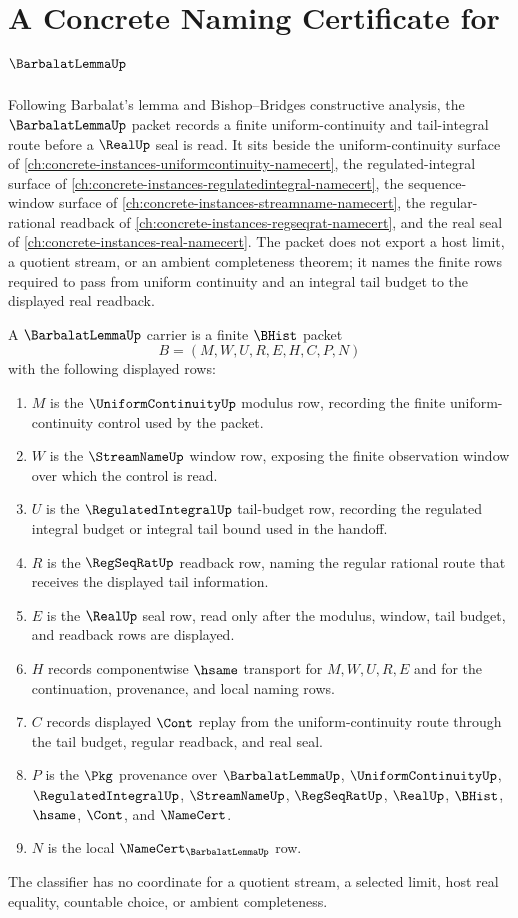 \chapter{A Concrete Naming Certificate for $\BarbalatLemmaUp$}
\label{ch:concrete-instances-barbalat-lemma-namecert}

Following Barbalat's lemma and Bishop--Bridges constructive analysis, the $\BarbalatLemmaUp$ packet records a finite uniform-continuity and tail-integral route before a $\RealUp$ seal is read. It sits beside the uniform-continuity surface of \autoref{ch:concrete-instances-uniformcontinuity-namecert}, the regulated-integral surface of \autoref{ch:concrete-instances-regulatedintegral-namecert}, the sequence-window surface of \autoref{ch:concrete-instances-streamname-namecert}, the regular-rational readback of \autoref{ch:concrete-instances-regseqrat-namecert}, and the real seal of \autoref{ch:concrete-instances-real-namecert}. The packet does not export a host limit, a quotient stream, or an ambient completeness theorem; it names the finite rows required to pass from uniform continuity and an integral tail budget to the displayed real readback.

\begin{definition}
\label{def:barbalat-lemma-finite-carrier}
A $\BarbalatLemmaUp$ carrier is a finite $\BHist$ packet
$$
B=(M,W,U,R,E,H,C,P,N)
$$
with the following displayed rows:
\begin{enumerate}
\item $M$ is the $\UniformContinuityUp$ modulus row, recording the finite uniform-continuity control used by the packet.
\item $W$ is the $\StreamNameUp$ window row, exposing the finite observation window over which the control is read.
\item $U$ is the $\RegulatedIntegralUp$ tail-budget row, recording the regulated integral budget or integral tail bound used in the handoff.
\item $R$ is the $\RegSeqRatUp$ readback row, naming the regular rational route that receives the displayed tail information.
\item $E$ is the $\RealUp$ seal row, read only after the modulus, window, tail budget, and readback rows are displayed.
\item $H$ records componentwise $\hsame$ transport for $M,W,U,R,E$ and for the continuation, provenance, and local naming rows.
\item $C$ records displayed $\Cont$ replay from the uniform-continuity route through the tail budget, regular readback, and real seal.
\item $P$ is the $\Pkg$ provenance over $\BarbalatLemmaUp$, $\UniformContinuityUp$, $\RegulatedIntegralUp$, $\StreamNameUp$, $\RegSeqRatUp$, $\RealUp$, $\BHist$, $\hsame$, $\Cont$, and $\NameCert$.
\item $N$ is the local $\NameCert_{\BarbalatLemmaUp}$ row.
\end{enumerate}
The classifier has no coordinate for a quotient stream, a selected limit, host real equality, countable choice, or ambient completeness.
\end{definition}

